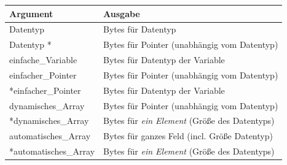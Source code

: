 
\begin{frame}
%
\begin{hintbox}
\begin{tabular}
	{m{.3\linewidth}|m{.65\linewidth}}
Argument               & Ausgabe \\ \hline\hline
Datentyp               & Bytes für Datentyp \\
Datentyp *             & Bytes für Pointer (unabhängig vom Datentyp) \\ \hline
einfache\_Variable     & Bytes für Datentyp der Variable \\
einfacher\_Pointer     & Bytes für Pointer (unabhängig vom Datentyp) \\
*einfacher\_Pointer    & Bytes für Datentyp der Variable \\ \hline
 dynamisches\_Array    & Bytes für Pointer (unabhängig vom Datentyp) \\
*dynamisches\_Array    & Bytes für \emph{ein Element} (Größe des Datentyps) \\ \hline
 automatisches\_Array  & Bytes für ganzes Feld (incl. Größe Datentyp) \\ 
*automatisches\_Array  & Bytes für \emph{ein Element} (Größe des Datentyps) \\ \hline
\end{tabular}
\end{hintbox}
%
\end{frame}


